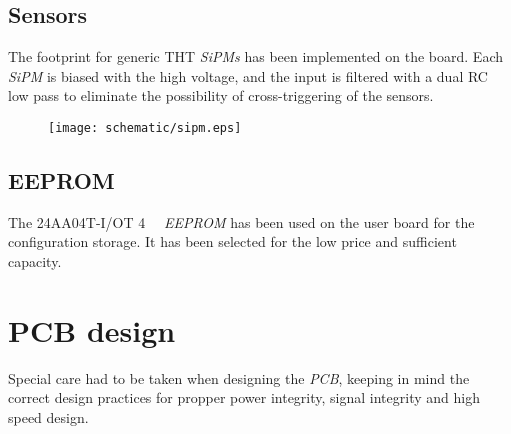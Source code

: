 \section{Sensors}
The footprint for generic THT \emph{SiPMs} has been implemented on the board. Each \emph{SiPM} is biased with the high voltage, and the input is filtered with a dual RC low pass to eliminate the possibility of cross-triggering of the sensors. 

\FloatBarrier
\begin{figure}[htp!]
    \centering
    \texttt{[image: schematic/sipm.eps]}
    \label{fig:sipm}
\end{figure}
\FloatBarrier

\section{EEPROM}
The 24AA04T-I/OT \SI{4}{\kilo\bit} \emph{EEPROM} has been used on the user board for the configuration storage. It has been selected for the low price and sufficient capacity. 

\newpage
\chapter{PCB design}
Special care had to be taken when designing the \emph{PCB}, keeping in mind the correct design practices for propper power integrity, signal integrity and high speed design.

